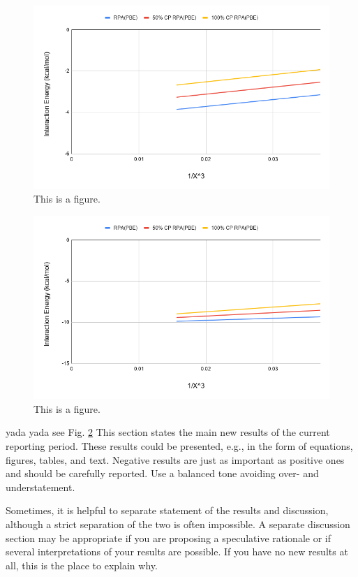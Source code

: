 \documentclass[11pt]{article}
\newcommand{\brian}[1]{{\color{orange} #1}}
\begin{document}
\begin{figure}
  \includegraphics[scale=0.5]{tpssh_30.png}
  \caption{This is a figure.}
  \label{fig:<name>}
\end{figure}

\begin{figure}
  \includegraphics[scale=0.5]{tpssh_38.png}
  \caption{This is a figure.}
  \label{fig:<name>}
\end{figure}


\brian{yada yada see Fig. \ref{fig:<name>}}
This section states the main new results of the current
reporting period. These results could be presented, e.g., in the form of
equations, figures, tables, and text. Negative results are just as
important as positive ones and should be carefully reported. Use a
balanced tone avoiding over- and understatement. 

Sometimes, it is helpful to separate statement of the results and
discussion, although a strict separation of the two is often
impossible. A separate discussion section may be appropriate if you are
proposing a speculative rationale or if several interpretations of your
results are possible. If you have no new results at all, this is the
place to explain why. 
\end{document}
